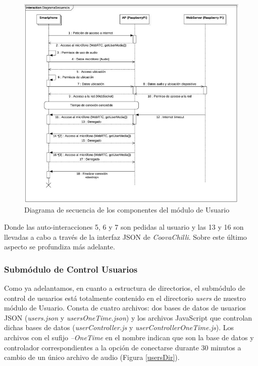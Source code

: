 \begin{figure}[!t]
\begin{center}
\includegraphics[width=0.75\linewidth]{./5_AnalisisOrganico/Img/diagramUML.png}
\end{center}
\caption{Diagrama de secuencia de los componentes del módulo de Usuario}
\label{diagramUML}
\end{figure}


Donde las auto-interacciones 5, 6 y 7 son pedidas al usuario y las 13 y 16 son llevadas a cabo a través de la interfaz JSON de \emph{CoovaChilli}. Sobre este último aspecto se profundiza más adelante.

\subsubsection{Submódulo de Control Usuarios} \label{userControl}

Como ya adelantamos, en cuanto a estructura de directorios, el submódulo de control de usuarios está totalmente contenido en el directorio \emph{users} de nuestro módulo de Usuario. Consta de cuatro archivos: dos bases de datos de usuarios JSON (\emph{users.json} y \emph{usersOneTime.json}) y los archivos JavaScript que controlan dichas bases de datos (\emph{userController.js} y \emph{userControllerOneTime.js}). Los archivos con el sufijo \emph{--OneTime} en el nombre indican que son la base de datos y controlador correspondientes a la opción de conectarse durante 30 minutos a cambio de un único archivo de audio (Figura \ref{usersDir}).


